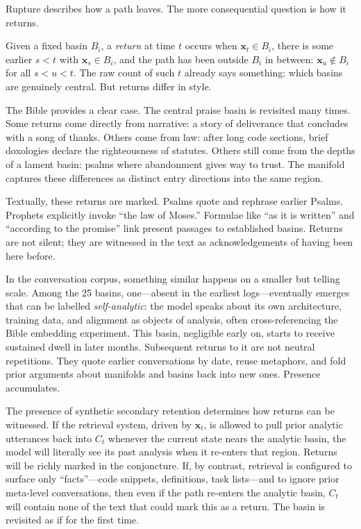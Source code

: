\documentclass[12pt,a4paper]{article}
\begin{document}
Rupture describes how a path leaves. The more consequential question is how it returns.

Given a fixed basin $B_i$, a \emph{return} at time $t$ occurs when $\mathbf{x}_t \in B_i$, there is some earlier $s < t$ with $\mathbf{x}_s \in B_i$, and the path has been outside $B_i$ in between: $\mathbf{x}_u \notin B_i$ for all $s < u < t$. The raw count of such $t$ already says something: which basins are genuinely central. But returns differ in style.

The Bible provides a clear case. The central praise basin is revisited many times. Some returns come directly from narrative: a story of deliverance that concludes with a song of thanks. Others come from law: after long code sections, brief doxologies declare the righteousness of statutes. Others still come from the depths of a lament basin: psalms where abandonment gives way to trust. The manifold captures these differences as distinct entry directions into the same region.

Textually, these returns are marked. Psalms quote and rephrase earlier Psalms. Prophets explicitly invoke ``the law of Moses.'' Formulae like ``as it is written'' and ``according to the promise'' link present passages to established basins. Returns are not silent; they are witnessed in the text as acknowledgements of having been here before.

In the conversation corpus, something similar happens on a smaller but telling scale. Among the 25 basins, one---absent in the earliest logs---eventually emerges that can be labelled \emph{self-analytic}: the model speaks about its own architecture, training data, and alignment as objects of analysis, often cross-referencing the Bible embedding experiment. This basin, negligible early on, starts to receive sustained dwell in later months. Subsequent returns to it are not neutral repetitions. They quote earlier conversations by date, reuse metaphors, and fold prior arguments about manifolds and basins back into new ones. Presence accumulates.

The presence of synthetic secondary retention determines how returns can be witnessed. If the retrieval system, driven by $\mathbf{x}_t$, is allowed to pull prior analytic utterances back into $C_t$ whenever the current state nears the analytic basin, the model will literally see its past analysis when it re-enters that region. Returns will be richly marked in the conjoncture. If, by contrast, retrieval is configured to surface only ``facts''---code snippets, definitions, task lists---and to ignore prior meta-level conversations, then even if the path re-enters the analytic basin, $C_t$ will contain none of the text that could mark this as a return. The basin is revisited as if for the first time.
\end{document}
